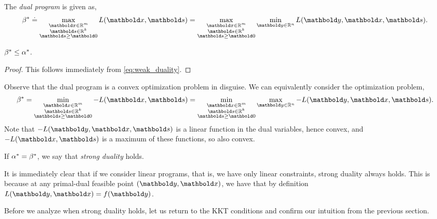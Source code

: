 \begin{defn} The \emph{dual program} is given as, \begin{align}
    \s{\beta} \defeq \max_{\substack{\vx \in \R^m \\ \vs \in \R^k \\ \vs \geq \vZero}} L(\vx, \vs) = \max_{\substack{\vx \in \R^m \\ \vs \in \R^k \\ \vs \geq \vZero}} \min_{\vy \in \R^n} L(\vy, \vx, \vs).
\end{align}
\end{defn}
\begin{thm}
$\beta^* \leq \alpha^*$.
\end{thm}
\begin{proof}
This follows immediately from \cref{eq:weak_duality}.
\end{proof}
\begin{rmk}
Observe that the dual program is a convex optimization problem in disguise. We can equivalently consider the optimization problem, \begin{align}
    \s{\beta} = \min_{\substack{\vx \in \R^m \\ \vs \in \R^k \\ \vs \geq \vZero}} - L(\vx, \vs) = \min_{\substack{\vx \in \R^m \\ \vs \in \R^k \\ \vs \geq \vZero}} \max_{\vy \in \R^n} - L(\vy, \vx, \vs).
\end{align} Note that $-L(\vy, \vx, \vs)$ is a linear function in the dual variables, hence convex, and $-L(\vx, \vs)$ is a maximum of these functions, so also convex.
\end{rmk}

\begin{defn} If $\alpha^* = \beta^*$, we say that \emph{strong duality} holds.
\end{defn}
\begin{rmk}
It is immediately clear that if we consider linear programs, that is, we have only linear constraints, strong duality always holds. This is because at any primal-dual feasible point $(\vy, \vx)$, we have that by definition $L(\vy, \vx) = f(\vy)$.
\end{rmk}

Before we analyze when strong duality holds, let us return to the KKT conditions and confirm our intuition from the previous section.

